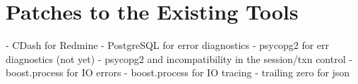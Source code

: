 \documentclass[deska]{subfiles}
\begin{document}
\chapter{Patches to the Existing Tools}
\label{sec:patches}

\begin{abstract}
\end{abstract}

- CDash for Redmine
- PostgreSQL for error diagnostics
- psycopg2 for err diagnostics (not yet)
- psycopg2 and incompatibility in the session/txn control
- boost.process for IO errors
- boost.process for IO tracing
- trailing zero for json
\end{document}
